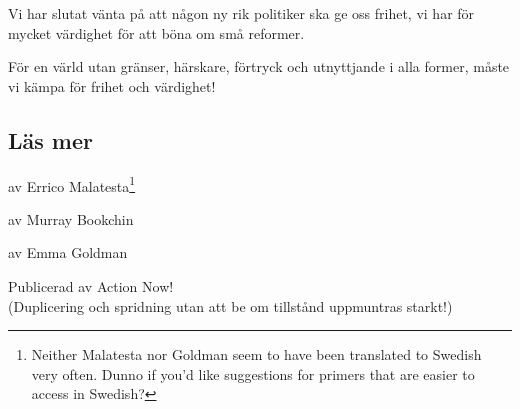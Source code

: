 \documentclass[
title=Bortom\ kaos!,
subtitle=En\ introduktion\ till\ anarkism,
subject=Anarkism,
creator=K.\ Räisänen,
author=Dawn\ Ray'd
]{pamphlet}
\begin{document}
    \begin{boldquote}
    	Vi har slutat vänta på att någon ny rik politiker ska ge oss frihet, vi har för mycket värdighet för att böna om små reformer.
    \end{boldquote}
    
    \begin{boldishquote}
    	För en värld utan gränser, härskare, förtryck och utnyttjande i alla former, måste vi kämpa för frihet och värdighet!
    \end{boldishquote}
    
    \vfill
    \subsection*{Läs mer}
    \begin{description}\footnotsize
    	\item[Anarchy] av Errico Malatesta\footnote{Neither Malatesta nor Goldman seem to have been translated to Swedish very often. Dunno if you'd like suggestions for primers that are easier to access in Swedish?}
    	\item[Ekologi \& anarki] av Murray Bookchin
    	\item[Anarchism. What it Realy Stands for] av Emma Goldman
    \end{description}
    \begin{center}\small
    	Publicerad av Action Now!\\
    	(Duplicering och spridning utan att be om tillstånd uppmuntras starkt!)
    \end{center}
\end{document}
